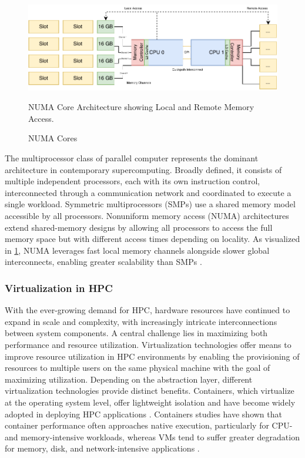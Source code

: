 \begin{figure}[H]
    \centering
    \includegraphics[scale=0.9]{fig/02/02-numa-cores.pdf}
    \caption{NUMA Cores}
    \label{fig:02-numa-cores}
    \tiny
    NUMA Core Architecture showing Local and Remote Memory Access.
\end{figure}

The multiprocessor class of parallel computer represents the dominant architecture in contemporary supercomputing. Broadly defined, it consists of multiple independent processors, each with its own instruction control, interconnected through a communication network and coordinated to execute a single workload. Symmetric multiprocessors (SMPs) use a shared memory model accessible by all processors. Nonuniform memory access (NUMA) architectures extend shared-memory designs by allowing all processors to access the full memory space but with different access times depending on locality. As visualized in \ref{fig:02-numa-cores}, NUMA leverages fast local memory channels alongside slower global interconnects, enabling greater scalability than SMPs \cite{5702048} \cite{7349577}.

\subsubsection{Virtualization in HPC}
\label{sec:background_hpc_virtualization}
With the ever-growing demand for HPC, hardware resources have continued to expand in scale and complexity, with increasingly intricate interconnections between system components. A central challenge lies in maximizing both performance and resource utilization. Virtualization technologies offer means to improve resource utilization in HPC environments by enabling the provisioning of resources to multiple users on the same physical machine with the goal of maximizing utilization. Depending on the abstraction layer, different virtualization technologies provide distinct benefits. Containers, which virtualize at the operating system level, offer lightweight isolation and have become widely adopted in deploying HPC applications \cite{9653557}. Containers studies have shown that container performance often approaches native execution, particularly for CPU- and memory-intensive workloads, whereas VMs tend to suffer greater degradation for memory, disk, and network-intensive applications \cite{8397647}.

